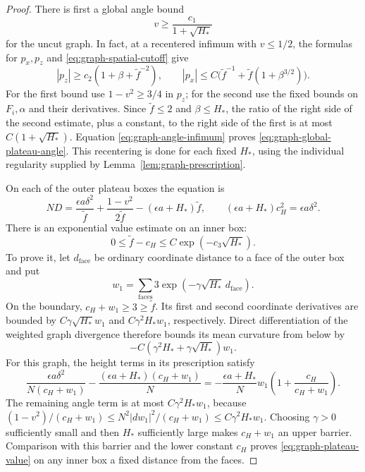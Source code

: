 \begin{proof}
There is first a global angle bound
\begin{equation}
 v\ge\frac{c_1}{1+\sqrt{H_*}}
 \label{eq:graph-global-plateau-angle}
\end{equation}
for the uncut graph.  In fact, at a recentered infimum with
\(v\le1/2\), the formulas for \(p_x,p_z\) and
\eqref{eq:graph-spatial-cutoff} give
\[
 |p_z|\ge c_2(1+\beta+\widetilde f^{-2}),\qquad
 |p_x|\le C\bigl(\widetilde f^{-1}
                    +\widetilde f(1+\beta^{3/2})\bigr).
\]
For the first bound use \(1-v^2\ge3/4\) in \(p_z\); for the
second use the fixed bounds on \(F_i,\alpha\) and their
derivatives.  Since \(\widetilde f\le2\) and \(\beta\le H_*\),
the ratio of the right side of the second estimate, plus a
constant, to the right side of the first is at most
\(C(1+\sqrt{H_*})\).  Equation
\eqref{eq:graph-angle-infimum} proves
\eqref{eq:graph-global-plateau-angle}.  This recentering is done
for each fixed \(H_*\), using the individual regularity supplied
by Lemma~\ref{lem:graph-prescription}.

On each of the outer plateau boxes the equation is
\begin{equation}
 ND=\frac{\epsilon a\delta^2}{\widetilde f}
       +\frac{1-v^2}{2\widetilde f}
       -(\epsilon a+H_*)\widetilde f,
 \qquad
 (\epsilon a+H_*)c_H^2=\epsilon a\delta^2 .
 \label{eq:graph-plateau-equation}
\end{equation}
There is an exponential value estimate on an inner box:
\begin{equation}
 0\le\widetilde f-c_H\le C\exp(-c_3\sqrt{H_*}).
 \label{eq:graph-plateau-value}
\end{equation}
To prove it, let \(d_{\mathrm{face}}\) be ordinary coordinate
distance to a face of the outer box and put
\[
 w_1=\sum_{\mathrm{faces}}3
          \exp(-\gamma\sqrt{H_*}\,d_{\mathrm{face}}).
\]
On the boundary, \(c_H+w_1\ge3\ge\widetilde f\).
Its first and second coordinate derivatives are bounded by
\(C\gamma\sqrt{H_*}w_1\) and \(C\gamma^2H_*w_1\),
respectively.  Direct differentiation of the weighted graph
divergence therefore bounds its mean curvature from below by
\[
 -C(\gamma^2H_*+\gamma\sqrt{H_*})w_1 .
\]
For this graph, the height terms in its prescription satisfy
\[
 \frac{\epsilon a\delta^2}{N(c_H+w_1)}
     -\frac{(\epsilon a+H_*)(c_H+w_1)}N
 =-\frac{\epsilon a+H_*}{N}w_1
             \left(1+\frac{c_H}{c_H+w_1}\right).
\]
The remaining angle term is at most
\(C\gamma^2H_*w_1\), because
\((1-v^2)/(c_H+w_1)\le
 N^2|dw_1|^2/(c_H+w_1)\le C\gamma^2H_*w_1\).
Choosing \(\gamma>0\) sufficiently small and then \(H_*\)
sufficiently large makes \(c_H+w_1\) an upper barrier.
Comparison with this barrier and the lower constant \(c_H\)
proves \eqref{eq:graph-plateau-value} on any inner box a fixed
distance from the faces.


\end{proof}
